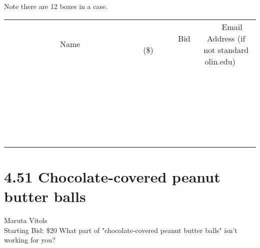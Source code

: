\documentclass[11pt]{article}
\begin{document}
Note there are 12 boxes in a case.
\\[6ex]
\begin{tabular}{c c c}
~~~~~~~~~~~~~Name~~~~~~~~~~~~~ & ~~~~~~~~~Bid (\$)~~~~~~~~~  & ~~~Email Address (if not standard olin.edu)~~~\\
 & & \\
\hline
 & & \\
\hline
 & & \\
\hline
 & & \\
\hline
 & & \\
\hline
 & & \\
\hline
 & & \\
\hline
 & & \\
\hline
 & & \\
\hline
 & & \\
\hline
 & & \\
\hline
 & & \\
\hline
 & & \\
\hline
 & & \\
\hline
 & & \\
\hline
 & & \\
\hline
 & & \\
\hline
 & & \\
\hline
 & & \\
\hline
 & & \\
\hline
 & & \\
\hline
 & & \\
\hline
 & & \\
\hline
 & & \\
\hline
 & & \\
\hline
 & & \\
\hline
\end{tabular}
\newpage
\section*{4.51 Chocolate-covered peanut butter balls}
Maruta Vitols
\\
Starting Bid: \$20
\newline
What part of "chocolate-covered peanut butter balls" isn't working for you?
\end{document}
